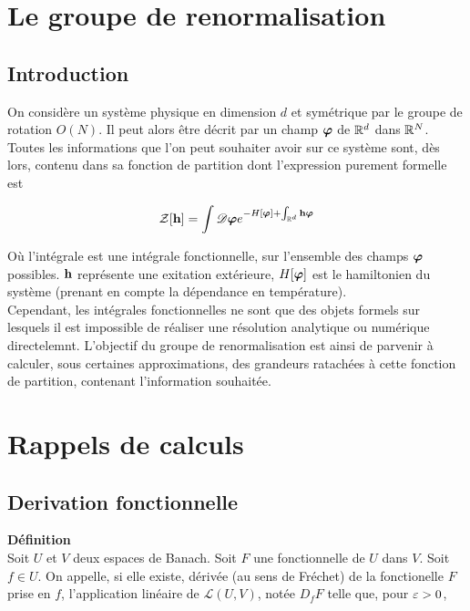 \documentclass[10pt]{article}
\begin{document}
\begin{multicols}{2}

\section{Le groupe de renormalisation}

\subsection{Introduction}

On considère un système physique en dimension $d$ et symétrique par le groupe de rotation $O(N)$. Il peut alors être décrit par un champ $\boldsymbol{ \varphi}$ de $\mathbb{R}^d$ dans $ \mathbb{R}^N$. Toutes les informations que l'on peut souhaiter avoir sur ce système sont, dès lors, contenu dans sa fonction de partition dont l'expression purement formelle est 

\begin{equation}
\mathcal{Z}[{\bf h}] = \int \mathscr{D} \boldsymbol{ \varphi} e^{-H[\boldsymbol{ \varphi}] + \int_{\mathbb{R}^d} {\bf h} \boldsymbol{ \varphi}} 
\end{equation} 

Où l'intégrale est une intégrale fonctionnelle, sur l'ensemble des champs $\boldsymbol{ \varphi}$ possibles. ${\bf h}$ représente une exitation extérieure, $H[\boldsymbol{ \varphi}]$ est le hamiltonien du système (prenant en compte la dépendance en température).\\

Cependant, les intégrales fonctionnelles ne sont que des objets formels sur lesquels il est impossible de réaliser une résolution analytique ou numérique directelemnt. L'objectif du groupe de renormalisation est ainsi de parvenir à calculer, sous certaines approximations, des grandeurs ratachées à cette fonction de partition, contenant l'information souhaitée. 

\pagebreak

\appendix

\section{Rappels de calculs}

\subsection{Derivation fonctionnelle}


\textbf{Définition}\\
Soit $U$ et $V$ deux espaces de Banach. Soit $F$ une fonctionnelle de $U$ dans $V$. 
Soit $f \in U$. On appelle, si elle existe, dérivée (au sens de Fréchet) de la fonctionelle $F$ prise en $f$, l'application linéaire de $\mathcal{L}(U,V)$, notée $D_fF$ telle que, pour $\varepsilon>0$, 


\end{multicols}
\end{document}
